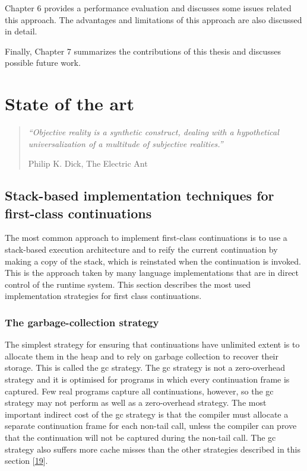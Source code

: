 \documentclass[12pt,a4paper,oneside,openright]{book}
\begin{document}
Chapter 6 provides a performance evaluation and discusses some issues
related this approach. The advantages and limitations of this approach
are also discussed in detail.

Finally, Chapter 7 summarizes the contributions of this thesis and
discusses possible future work.

\chapter{State of the art}\label{state-of-the-art}

\begin{quote}
\emph{``Objective reality is a synthetic construct, dealing with a
hypothetical universalization of a multitude of subjective realities.''}

\begin{flushright}
Philip K. Dick, The Electric Ant
\end{flushright}
\end{quote}

\section{Stack-based implementation techniques for first-class
continuations}\label{stack-based-implementation-techniques-for-first-class-continuations}

The most common approach to implement first-class continuations is to
use a stack-based execution architecture and to reify the current
continuation by making a copy of the stack, which is reinstated when the
continuation is invoked. This is the approach taken by many language
implementations that are in direct control of the runtime system. This
section describes the most used implementation strategies for first
class continuations.

\subsection{The garbage-collection
strategy}\label{the-garbage-collection-strategy}

The simplest strategy for ensuring that continuations have unlimited
extent is to allocate them in the heap and to rely on garbage collection
to recover their storage. This is called the gc strategy. The gc
strategy is not a zero-overhead strategy and it is optimised for
programs in which every continuation frame is captured. Few real
programs capture all continuations, however, so the gc strategy may not
perform as well as a zero-overhead strategy. The most important indirect
cost of the gc strategy is that the compiler must allocate a separate
continuation frame for each non-tail call, unless the compiler can prove
that the continuation will not be captured during the non-tail call. The
gc strategy also suffers more cache misses than the other strategies
described in this section {[}\hyperref[ref-Clinger1999]{19}{]}.
\end{document}
